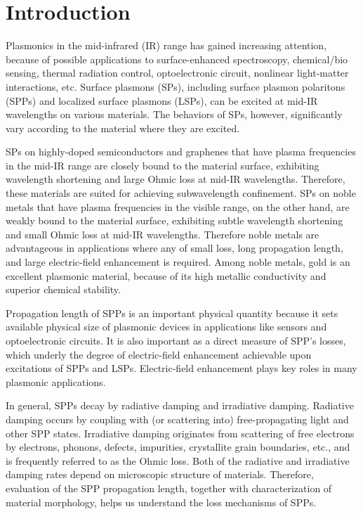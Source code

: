 \documentclass[aip,apl,reprint]{revtex4-1}
\begin{document}
\section{Introduction}
Plasmonics in the mid-infrared (IR) range has gained increasing attention,\cite{Stanley, Law} because of \color{red}possible \color{black}applications to surface-enhanced spectroscopy,\cite{Neubrech, Hoang} chemical/bio sensing,\cite{Cleary2008} thermal radiation control,\cite{Kusunoki} optoelectronic circuit,\cite{Ebbesen, Soref} nonlinear light-matter interactions,\cite{Kusa2015} etc. Surface plasmons (SPs), including surface plasmon polaritons (SPPs) and localized surface plasmons (LSPs), can be excited at mid-IR wavelengths on various materials.\cite{Law} The behaviors of SPs, however, significantly vary according to the material where they are excited.\cite{Law} 

\color{red}SPs on highly-doped semiconductors and graphenes that have plasma frequencies in the mid-IR range \color{black}are closely bound to the material surface, exhibiting wavelength shortening and large Ohmic loss at mid-IR wavelengths. Therefore, these materials are suited for achieving subwavelength confinement. \color{red}SPs on noble metals that have plasma frequencies in the visible range, on the other hand, \color{black}are weakly bound to the material surface, exhibiting subtle wavelength shortening and small Ohmic loss at mid-IR wavelengths. Therefore noble metals are advantageous in applications where any of small loss, long propagation length, and large electric-field enhancement is required.\cite{Law, Kusa2014}
\color{red}Among noble metals, gold is an excellent plasmonic material, because of its high metallic conductivity and superior chemical stability.\cite{Zayats}\color{black}

Propagation length of SPPs is an important physical quantity \color{red}because \color{black}it sets \color{red}available physical size of plasmonic devices in applications like \color{black}sensors and optoelectronic circuits. \color{red}It is also important as \color{black}a direct measure of SPP's losses, which underly the degree of electric-field enhancement \color{red}achievable upon excitations of SPPs and LSPs. \color{black}Electric-field enhancement plays key roles in many plasmonic applications.

In general, \color{red}SPPs decay \color{black}by radiative damping and irradiative damping. Radiative damping occurs by coupling with \color{red}(or scattering into) \color{black}free-propagating light and other SPP states. Irradiative damping originates from scattering of free electrons by electrons, phonons, defects, impurities, crystallite grain boundaries, etc., and is frequently referred to as the Ohmic loss. Both of the radiative and irradiative damping rates depend on microscopic structure of materials. Therefore, evaluation of the SPP propagation length, together with characterization of material morphology, helps us understand the loss mechanisms of SPPs.
\end{document}

